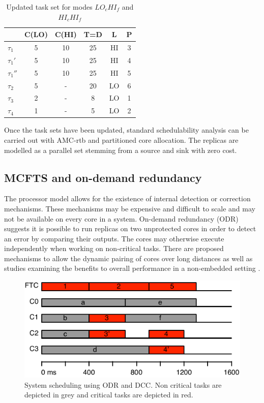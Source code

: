 \documentclass[table,11pt]{article}
\begin{document}
   \begin{table}
\centering
\caption{Updated task set for modes $LO_cHI_f$ and $HI_cHI_f$}
\begin{tabular}{@{}l|ccccc@{}}
\toprule
		& C(LO) & C(HI) & T=D & L & P	 \\\bottomrule
$\tau_1$ & 5 & 10 & 25 & HI & 3 \\
$\tau_1'$ & 5 & 10 & 25 & HI & 4 \\
$\tau_1''$ & 5 & 10 & 25 & HI & 5 \\
$\tau_2$ & 5 & - & 20 & LO & 6 \\
$\tau_3$ & 2 & - & 8 & LO & 1 \\
$\tau_4$ & 1 & - & 5 & LO & 2 \\
\end{tabular}
\label{t:exampletask3}  
\end{table}
   
Once the task sets have been updated, standard schedulability analysis can be carried out with AMC-rtb and partitioned core allocation. The replicas are modelled as a parallel set stemming from a source and sink with zero cost.

\subsection{MCFTS and on-demand redundancy}

The processor model allows for the existence of internal detection or correction mechanisms. These mechanisms may be expensive and difficult to scale and may not be available on every core in a system. On-demand redundancy (ODR) \cite{c} suggests it is possible to run replicas on two unprotected cores in order to detect an error by comparing their outputs. The cores may otherwise execute independently when working on non-critical tasks. There are proposed mechanisms \cite{c} to allow the dynamic pairing of cores over long distances as well as studies examining the benefits to overall performance in a non-embedded setting \cite{c}. 
   
   \begin{figure}
\centering
\includegraphics[scale=1]{figures/schedule-dcc.pdf}
\caption{System scheduling using ODR and DCC. Non critical tasks are depicted in grey and critical tasks are depicted in red.}
\label{f:schedule-dcc}
\end{figure}
\end{document}
